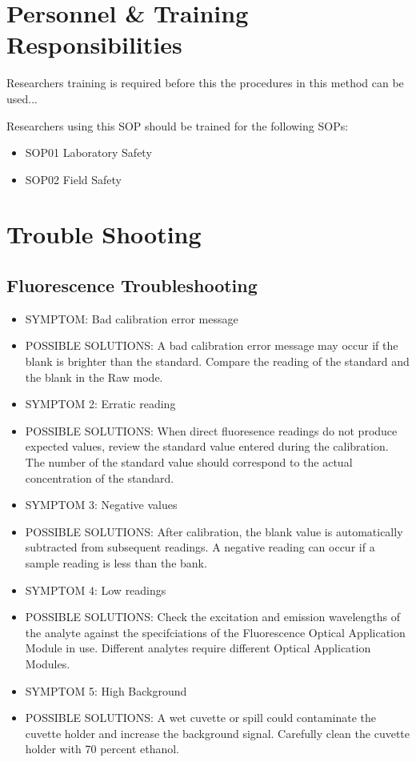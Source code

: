 \documentclass[12pt]{../SOP3_beta}
\begin{document}
\section{Personnel \& Training Responsibilities}

\NP Researchers training is required before this the procedures in this method can be used... 

\NP Researchers using this SOP should be trained for the following SOPs:

\begin{itemize}
  \item SOP01 Laboratory Safety
  \item SOP02 Field Safety
\end{itemize}

\section{Trouble Shooting}
\subsection{Fluorescence Troubleshooting}
\begin{itemize}
  \item SYMPTOM: Bad calibration error message
  \item POSSIBLE SOLUTIONS: A bad calibration error message may occur if the blank is brighter than the standard. Compare the reading of the standard and the blank in the Raw mode. 
  \item SYMPTOM 2: Erratic reading
  \item POSSIBLE SOLUTIONS: When direct fluoresence readings do not produce expected values, review the standard value entered during the calibration. The number of the standard value should correspond to the actual concentration of the standard.
  \item SYMPTOM 3: Negative values
  \item POSSIBLE SOLUTIONS: After calibration, the blank value is automatically subtracted from subsequent readings. A negative reading can occur if a sample reading is less than the bank.
  \item SYMPTOM 4: Low readings
  \item POSSIBLE SOLUTIONS: Check the excitation and emission wavelengths of the analyte against the specifciations of the Fluorescence Optical Application Module in use. Different analytes require different Optical Application Modules.
  \item SYMPTOM 5: High Background
  \item POSSIBLE SOLUTIONS: A wet cuvette or spill could contaminate the cuvette holder and increase the background signal. Carefully clean the cuvette holder with 70 percent ethanol. 
\end{itemize}
\end{document}
